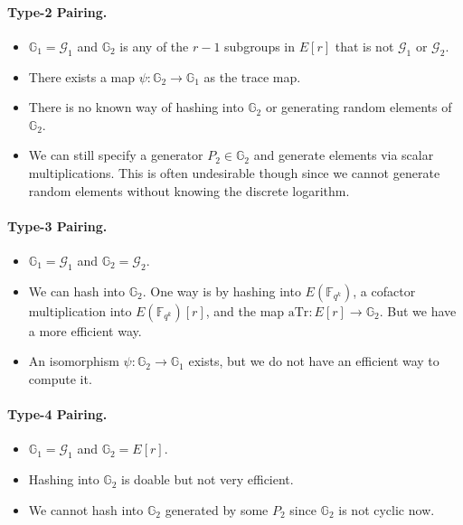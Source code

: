 \paragraph{Type-2 Pairing.}

\begin{itemize}
	\item $\mathbb{G}_1 = \mathcal{G}_1$ and $\mathbb{G}_2$ is any of the $r-1$ subgroups in $E[r]$ that is not $\mathcal{G}_1$ or $\mathcal{G}_2$.
	\item There exists a map $\psi: \mathbb{G}_2 \to \mathbb{G}_1$ as the trace map.
	\item There is no known way of hashing into $\mathbb{G}_2$ or generating random elements of $\mathbb{G}_2$.
	\item We can still specify a generator $P_2 \in \mathbb{G}_2$ and generate elements via scalar multiplications. This is often undesirable though since we cannot generate random elements without knowing the discrete logarithm.
\end{itemize}

\paragraph{Type-3 Pairing.}

\begin{itemize}
	\item $\mathbb{G}_1 = \mathcal{G}_1$ and $\mathbb{G}_2 = \mathcal{G_2}$.
	\item We can hash into $\mathbb{G}_2$. One way is by hashing into $E(\mathbb{F}_{q^k})$, a cofactor multiplication into $E(\mathbb{F}_{q^k})[r]$, and the map $\text{aTr}: E[r] \to \mathbb{G}_2$. But we have a more efficient way.
	\item An isomorphism $\psi:\mathbb{G}_2 \to \mathbb{G}_1$ exists, but we do not have an efficient way to compute it.
\end{itemize}

\paragraph{Type-4 Pairing.}

\begin{itemize}
	\item $\mathbb{G}_1 = \mathcal{G}_1$ and $\mathbb{G}_2 = E[r]$.
	\item Hashing into $\mathbb{G}_2$ is doable but not very efficient.
	\item We cannot hash into $\mathbb{G}_2$ generated by some $P_2$ since $\mathbb{G}_2$ is not cyclic now.
\end{itemize}

